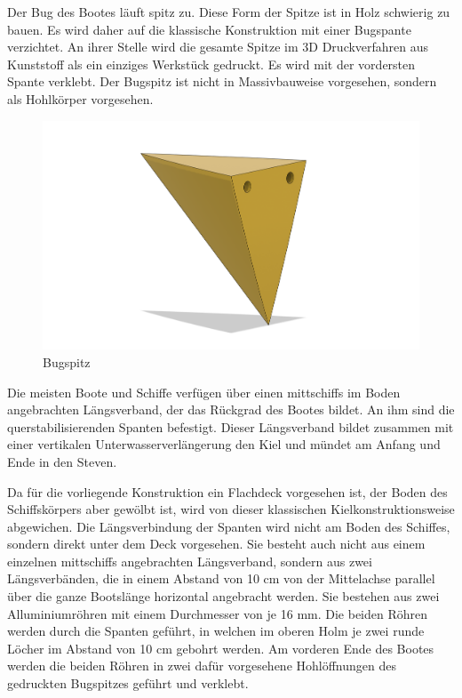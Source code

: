 Der Bug des Bootes läuft spitz zu. Diese Form der Spitze ist in Holz schwierig zu bauen. Es wird daher auf die klassische Konstruktion mit einer Bugspante verzichtet. An ihrer Stelle wird die gesamte Spitze im 3D Druckverfahren aus Kunststoff als ein einziges Werkstück gedruckt. Es wird mit der vordersten Spante verklebt. Der Bugspitz ist nicht in Massivbauweise vorgesehen, sondern als Hohlkörper vorgesehen.
\begin{figure}[H]
    \centering
    \includegraphics[width=0.8\linewidth]{assets/bug_spitz.png}
 \caption{Bugspitz}
    
\end{figure}
Die meisten Boote und Schiffe verfügen über einen mittschiffs im Boden angebrachten Längsverband, der das Rückgrad des Bootes bildet. An ihm sind die querstabilisierenden Spanten befestigt. Dieser Längsverband bildet zusammen mit einer vertikalen Unterwasserverlängerung den Kiel und mündet am Anfang und Ende in den Steven. 

Da für die vorliegende Konstruktion ein Flachdeck vorgesehen ist, der Boden des Schiffskörpers aber gewölbt ist, wird von dieser klassischen Kielkonstruktionsweise abgewichen. Die Längsverbindung der Spanten wird nicht am Boden des Schiffes, sondern direkt unter dem Deck vorgesehen. Sie besteht auch nicht aus einem einzelnen mittschiffs angebrachten Längsverband, sondern aus zwei Längsverbänden, die in einem Abstand von 10 cm von der Mittelachse parallel über die ganze Bootslänge horizontal angebracht werden. Sie bestehen aus zwei Alluminiumröhren mit einem Durchmesser von je 16 mm. Die beiden Röhren werden durch die Spanten geführt, in welchen im oberen Holm je zwei runde Löcher im Abstand von 10 cm gebohrt werden. Am vorderen Ende des Bootes werden die beiden Röhren in zwei dafür vorgesehene Hohlöffnungen des gedruckten Bugspitzes geführt und verklebt.

